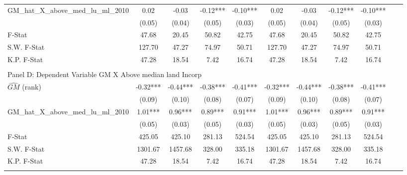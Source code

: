 \begin{table}[htbp]
\begin{threeparttable}
\begin{tabular}{l*{10}{c}}
\addlinespace
GM\_hat\_X\_above\_med\_lu\_ml\_2010&       0.02   &      -0.03   &      -0.12***&      -0.10***&       0.02   &      -0.03   &      -0.12***&      -0.10***\\
                &     (0.05)   &     (0.04)   &     (0.05)   &     (0.03)   &     (0.05)   &     (0.04)   &     (0.05)   &     (0.03)   \\
\midrule
F-Stat          &      47.68   &      20.45   &      50.82   &      42.75   &      47.68   &      20.45   &      50.82   &      42.75   \\
S.W. F-Stat     &     127.70   &      47.27   &      74.97   &      50.71   &     127.70   &      47.27   &      74.97   &      50.71   \\
K.P. F-Stat     &      47.28   &      18.54   &       7.42   &      16.74   &      47.28   &      18.54   &       7.42   &      16.74   \\
\cmidrule[\heavyrulewidth](lr){1-9} \\ \cmidrule[\heavyrulewidth](lr){1-9}
\multicolumn{8}{l}{Panel D: Dependent Variable GM X Above median land Incorp}\\
\cmidrule(lr){1-9}
$\hat{GM}$ (rank)&      -0.32***&      -0.44***&      -0.38***&      -0.41***&      -0.32***&      -0.44***&      -0.38***&      -0.41***\\
                &     (0.09)   &     (0.10)   &     (0.08)   &     (0.07)   &     (0.09)   &     (0.10)   &     (0.08)   &     (0.07)   \\
\addlinespace
GM\_hat\_X\_above\_med\_lu\_ml\_2010&       1.01***&       0.96***&       0.89***&       0.91***&       1.01***&       0.96***&       0.89***&       0.91***\\
                &     (0.05)   &     (0.03)   &     (0.05)   &     (0.03)   &     (0.05)   &     (0.03)   &     (0.05)   &     (0.03)   \\
\midrule
F-Stat          &     425.05   &     425.10   &     281.13   &     524.54   &     425.05   &     425.10   &     281.13   &     524.54   \\
S.W. F-Stat     &    1301.67   &    1457.68   &     328.00   &     335.18   &    1301.67   &    1457.68   &     328.00   &     335.18   \\
K.P. F-Stat     &      47.28   &      18.54   &       7.42   &      16.74   &      47.28   &      18.54   &       7.42   &      16.74   \\
\cmidrule[\heavyrulewidth](lr){1-9} \\ \cmidrule[\heavyrulewidth](lr){1-9}

\end{tabular}
\end{threeparttable}
\end{table}
